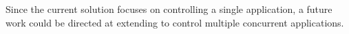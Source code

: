 Since the current solution focuses on controlling a single application, a future work could be directed at extending \tool to control multiple concurrent applications.

\vfill
\newpage




